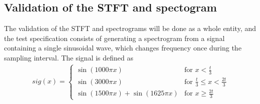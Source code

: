 \subsection{Validation of the STFT and spectogram}
The validation of the STFT and spectrograms will be done as a whole entity, and the test specification consists of generating a spectrogram from a signal containing a single sinusoidal wave, which changes frequency once during the sampling interval. The signal is defined as
\begin{align}\label{eq:SPECTROsignal}
sig(x)=\begin{cases}\sin(1000\pi x)&\text{for }x<\frac{t}{3}\\
\sin(3000\pi x)&\text{for }\frac{t}{3}\leq x < \frac{2t}{3}\\
\sin(1500\pi x)+\sin(1625\pi x)&\text{for }x\geq\frac{2t}{3}
\end{cases}
\end{align}

